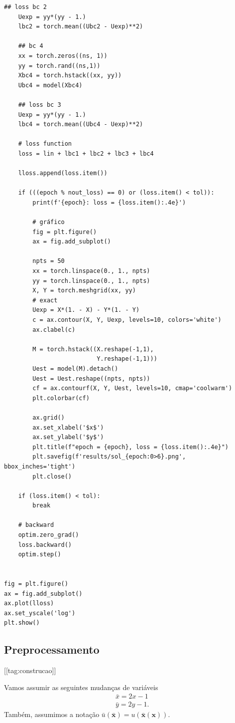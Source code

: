 \begin{lstlisting}[caption=pyEqLaplace]
    ## loss bc 2
    Uexp = yy*(yy - 1.)
    lbc2 = torch.mean((Ubc2 - Uexp)**2)

    ## bc 4
    xx = torch.zeros((ns, 1))
    yy = torch.rand((ns,1))
    Xbc4 = torch.hstack((xx, yy))
    Ubc4 = model(Xbc4)

    ## loss bc 3
    Uexp = yy*(yy - 1.)
    lbc4 = torch.mean((Ubc4 - Uexp)**2)

    # loss function
    loss = lin + lbc1 + lbc2 + lbc3 + lbc4

    lloss.append(loss.item())
    
    if (((epoch % nout_loss) == 0) or (loss.item() < tol)):
        print(f'{epoch}: loss = {loss.item():.4e}')
    
        # gráfico
        fig = plt.figure()
        ax = fig.add_subplot()

        npts = 50
        xx = torch.linspace(0., 1., npts)
        yy = torch.linspace(0., 1., npts)
        X, Y = torch.meshgrid(xx, yy)
        # exact
        Uexp = X*(1. - X) - Y*(1. - Y)
        c = ax.contour(X, Y, Uexp, levels=10, colors='white')
        ax.clabel(c)

        M = torch.hstack((X.reshape(-1,1),
                          Y.reshape(-1,1)))
        Uest = model(M).detach()
        Uest = Uest.reshape((npts, npts))
        cf = ax.contourf(X, Y, Uest, levels=10, cmap='coolwarm')
        plt.colorbar(cf)
        
        ax.grid()
        ax.set_xlabel('$x$')
        ax.set_ylabel('$y$')
        plt.title(f"epoch = {epoch}, loss = {loss.item():.4e}")
        plt.savefig(f'results/sol_{epoch:0>6}.png', bbox_inches='tight')
        plt.close()

    if (loss.item() < tol):
        break

    # backward
    optim.zero_grad()
    loss.backward()
    optim.step()


fig = plt.figure()
ax = fig.add_subplot()
ax.plot(lloss)
ax.set_yscale('log')
plt.show()
\end{lstlisting}

\subsection{Preprocessamento}
[[tag:construcao]]

Vamos assumir as seguintes mudanças de variáveis
\begin{subequations}
  \begin{align}
    &\bar{x} = 2x - 1\\
    &\bar{y} = 2y - 1.
  \end{align}
\end{subequations}
Também, assumimos a notação $\bar{u}\left(\bar{\pmb{x}}\right) = u\left(\bar{\pmb{x}}(\pmb{x})\right)$.

